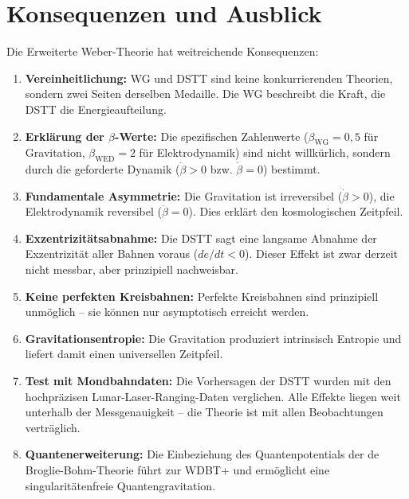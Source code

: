 \documentclass[12pt,a4paper]{article}
\begin{document}
\section{Konsequenzen und Ausblick}

Die Erweiterte Weber-Theorie hat weitreichende Konsequenzen:

\begin{enumerate}
    \item \textbf{Vereinheitlichung:} WG und DSTT sind keine konkurrierenden Theorien, sondern zwei Seiten derselben Medaille. Die WG beschreibt die Kraft, die DSTT die Energieaufteilung.
    
    \item \textbf{Erklärung der \(\beta\)-Werte:} Die spezifischen Zahlenwerte (\(\beta_{\text{WG}} = 0,5\) für Gravitation, \(\beta_{\text{WED}} = 2\) für Elektrodynamik) sind nicht willkürlich, sondern durch die geforderte Dynamik (\(\dot{\beta} > 0\) bzw. \(\dot{\beta} = 0\)) bestimmt.
    
    \item \textbf{Fundamentale Asymmetrie:} Die Gravitation ist irreversibel (\(\dot{\beta} > 0\)), die Elektrodynamik reversibel (\(\dot{\beta} = 0\)). Dies erklärt den kosmologischen Zeitpfeil.
    
    \item \textbf{Exzentrizitätsabnahme:} Die DSTT sagt eine langsame Abnahme der Exzentrizität aller Bahnen voraus (\(de/dt < 0\)). Dieser Effekt ist zwar derzeit nicht messbar, aber prinzipiell nachweisbar.
    
    \item \textbf{Keine perfekten Kreisbahnen:} Perfekte Kreisbahnen sind prinzipiell unmöglich – sie können nur asymptotisch erreicht werden.
    
    \item \textbf{Gravitationsentropie:} Die Gravitation produziert intrinsisch Entropie und liefert damit einen universellen Zeitpfeil.
    
    \item \textbf{Test mit Mondbahndaten:} Die Vorhersagen der DSTT wurden mit den hochpräzisen Lunar-Laser-Ranging-Daten verglichen. Alle Effekte liegen weit unterhalb der Messgenauigkeit – die Theorie ist mit allen Beobachtungen verträglich.
    
    \item \textbf{Quantenerweiterung:} Die Einbeziehung des Quantenpotentials der de Broglie-Bohm-Theorie führt zur WDBT+ und ermöglicht eine singularitätenfreie Quantengravitation.
\end{enumerate}
\end{document}
